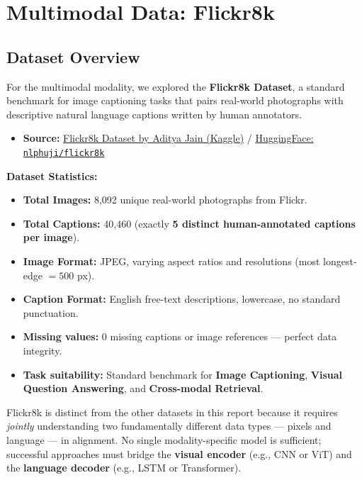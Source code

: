 \documentclass[twoside]{hcmut-report}
\begin{document}
\section{Multimodal Data: Flickr8k}
\label{sec:multi}

\subsection{Dataset Overview}
For the multimodal modality, we explored the \textbf{Flickr8k Dataset}, a standard benchmark for image captioning tasks that pairs real-world photographs with descriptive natural language captions written by human annotators.

\begin{itemize}
    \item \textbf{Source:} \href{https://www.kaggle.com/datasets/adityajn105/flickr8k}{Flickr8k Dataset by Aditya Jain (Kaggle)} / \href{https://huggingface.co/datasets/nlphuji/flickr8k}{HuggingFace: \texttt{nlphuji/flickr8k}}
\end{itemize}

\begin{importantbox}
\textbf{Dataset Statistics:}
\begin{itemize}
    \item \textbf{Total Images:} 8{,}092 unique real-world photographs from Flickr.
    \item \textbf{Total Captions:} 40{,}460 (exactly \textbf{5 distinct human-annotated captions per image}).
    \item \textbf{Image Format:} JPEG, varying aspect ratios and resolutions (most longest-edge $= 500$ px).
    \item \textbf{Caption Format:} English free-text descriptions, lowercase, no standard punctuation.
    \item \textbf{Missing values:} 0 missing captions or image references --- perfect data integrity.
    \item \textbf{Task suitability:} Standard benchmark for \textbf{Image Captioning}, \textbf{Visual Question Answering}, and \textbf{Cross-modal Retrieval}.
\end{itemize}
\end{importantbox}

Flickr8k is distinct from the other datasets in this report because it requires \emph{jointly} understanding two fundamentally different data types --- pixels and language --- in alignment. No single modality-specific model is sufficient; successful approaches must bridge the \textbf{visual encoder} (e.g., CNN or ViT) and the \textbf{language decoder} (e.g., LSTM or Transformer).
\end{document}
